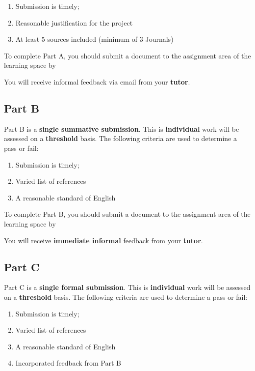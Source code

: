 \documentclass{../fal_assignment}
\begin{document}
\begin{enumerate}[label=(\alph*)]
	\item Submission is timely;
	\item Reasonable justification for the project
	\item At least 5 sources included (minimum of 3 Journals)
\end{enumerate}

To complete Part A, you should submit a document to the assignment area of the learning space by 

You will receive informal feedback via email from your \textbf{tutor}.

\subsection*{Part B}

Part B is a \textbf{single summative submission}. This is \textbf{individual} work will be assessed on a \textbf{threshold} basis. The following criteria are used to determine a pass or fail: 

\begin{enumerate}[label=(\alph*)]
	\item Submission is timely;
	\item Varied list of references
	\item A reasonable standard of English
\end{enumerate}

To complete Part B, you should submit a document to the assignment area of the learning space by 

You will receive \textbf{immediate informal} feedback from your \textbf{tutor}.


\subsection*{Part C}

Part C is a \textbf{single formal submission}. This is \textbf{individual} work will be assessed on a \textbf{threshold} basis. The following criteria are used to determine a pass or fail: 

\begin{enumerate}[label=(\alph*)]
	\item Submission is timely;
	\item Varied list of references
	\item A reasonable standard of English
	\item Incorporated feedback from Part B
\end{enumerate}
\end{document}
